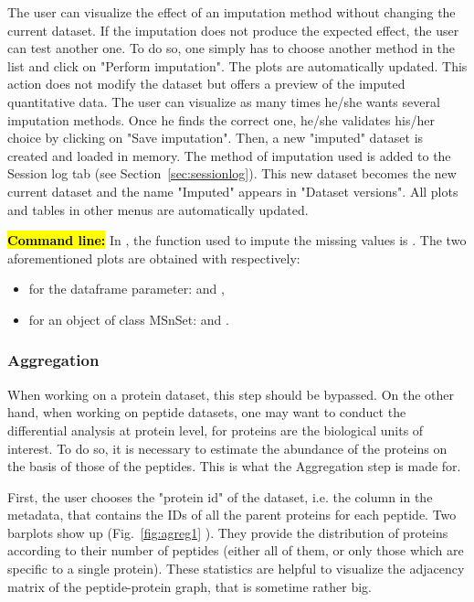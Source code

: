\documentclass[12pt]{article}
\begin{document}
{The user can visualize the effect of an imputation method without changing 
the current dataset. If the imputation does not produce the expected effect, 
the user can test another one. To do so, one simply has to choose another 
method in the list and click on "Perform imputation". The plots are 
automatically updated. This action does not modify the dataset but offers a 
preview of the imputed quantitative data.
The user can visualize as many times he/she wants several imputation methods. 
Once he finds the correct one, he/she validates his/her choice by clicking on 
"Save imputation". Then, a new "imputed" dataset is created and loaded in 
memory. The method of imputation used is added to the Session log tab (see 
Section~\ref{sec:sessionlog}). This new dataset becomes the new current 
dataset and the name "Imputed" appears in "Dataset versions". All plots and 
tables in other menus are automatically updated.

{\hl{\bf Command line:} In , the function used to impute the 
missing values is . The two aforementioned plots 
are obtained with respectively:
\begin{itemize}
\item for the dataframe parameter:  and 
,
\item for an object of class MSnSet:  and 
.
\end{itemize}}

\subsubsection{Aggregation}\label{aggregation}


{When working on a protein dataset, this step should be bypassed. On the other 
hand, when working on peptide datasets, one may want to conduct the 
differential analysis at protein level, for proteins are the biological units 
of interest. To do so, it is necessary to estimate the abundance of the 
proteins on the basis of those of the peptides. This is what the Aggregation 
step is made for.}

{First, the user chooses the "protein id" of the dataset, i.e. the column in 
the metadata, that contains the IDs of all the parent proteins for each 
peptide. 
Two barplots show up (Fig.~\ref{fig:agreg1} ). They provide the distribution 
of proteins according to their number of peptides (either all of them, or 
only those which are specific to a single protein). These statistics are 
helpful to visualize the adjacency matrix of the peptide-protein graph, that 
is sometime rather big.}


}
\end{document}

